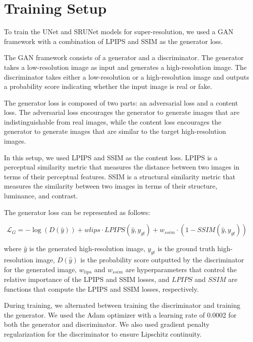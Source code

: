 \section{Training Setup}

To train the UNet and SRUNet models for super-resolution, we used a GAN framework with a combination of LPIPS and SSIM as the generator loss.

The GAN framework consists of a generator and a discriminator. The generator takes a low-resolution image as input and generates a high-resolution image. The discriminator takes either a low-resolution or a high-resolution image and outputs a probability score indicating whether the input image is real or fake.

The generator loss is composed of two parts: an adversarial loss and a content loss. The adversarial loss encourages the generator to generate images that are indistinguishable from real images, while the content loss encourages the generator to generate images that are similar to the target high-resolution images.

In this setup, we used LPIPS and SSIM as the content loss. LPIPS is a perceptual similarity metric that measures the distance between two images in terms of their perceptual features. SSIM is a structural similarity metric that measures the similarity between two images in terms of their structure, luminance, and contrast.

The generator loss can be represented as follows:

$$\mathcal{L}_{G} = -\log(D(\hat{y})) + w{lips}\cdot LPIPS(\hat{y}, y_{gt}) + w_{ssim} \cdot (1 - SSIM(\hat{y}, y_{gt}))$$

where $\hat{y}$ is the generated high-resolution image, $y_{gt}$ is the ground truth high-resolution image, $D(\hat{y})$ is the probability score outputted by the discriminator for the generated image, $w_{lips}$ and $w_{ssim}$ are hyperparameters that control the relative importance of the LPIPS and SSIM losses, and $LPIPS$ and $SSIM$ are functions that compute the LPIPS and SSIM losses, respectively.

During training, we alternated between training the discriminator and training the generator. We used the Adam optimizer with a learning rate of 0.0002 for both the generator and discriminator. We also used gradient penalty regularization for the discriminator to ensure Lipschitz continuity.

